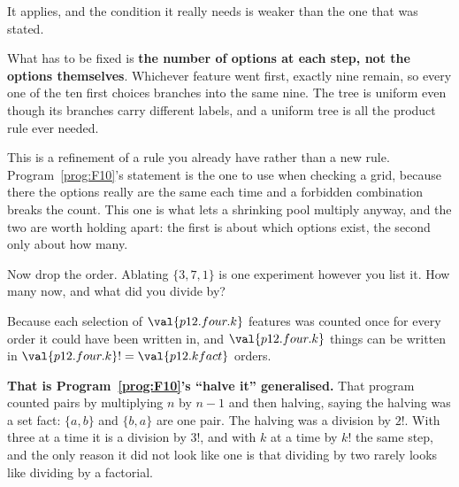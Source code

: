 \begin{fr}
\begin{ansblock}
It applies, and the condition it really needs is weaker than the one that was
stated.
\end{ansblock}

What has to be fixed is \textbf{the number of options at each step, not the
options themselves}. Whichever feature went first, exactly nine remain, so
every one of the ten first choices branches into the same nine. The tree is
uniform even though its branches carry different labels, and a uniform tree is
all the product rule ever needed.

\begin{note}
This is a refinement of a rule you already have rather than a new rule.
Program~\ref{prog:F10}'s statement is the one to use when checking a grid,
because there the options really are the same each time and a forbidden
combination breaks the count. This one is what lets a shrinking pool multiply
anyway, and the two are worth holding apart: the first is about which options
exist, the second only about how many.
\end{note}

Now drop the order. Ablating $\{3, 7, 1\}$ is one experiment however you list
it. How many now, and what did you divide by?
\dotline
\nextframe
\end{fr}

\begin{fr}
Because each selection of $\val{p12.four.k}$ features was counted once for
every order it could have been written in, and $\val{p12.four.k}$ things can
be written in $\val{p12.four.k}! = \val{p12.kfact}$ orders.

\textbf{That is Program~\ref{prog:F10}'s \enquote{halve it} generalised.} That
program counted pairs by multiplying $n$ by $n-1$ and then halving, saying the
halving was a set fact: $\{a, b\}$ and $\{b, a\}$ are one pair. The halving
was a division by $2!$. With three at a time it is a division by $3!$, and
with $k$ at a time by $k!$ \dash{} the same step, and the only reason it did
not look like one is that dividing by two rarely looks like dividing by a
factorial.
\end{fr}

